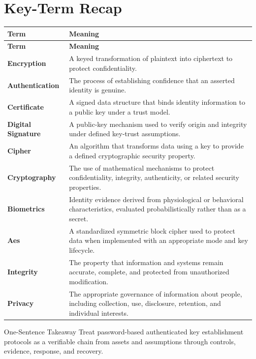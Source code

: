 \documentclass[11pt,letterpaper]{article}
\begin{document}
\section*{Key-Term Recap}
\begin{longtable}{>{\raggedright\arraybackslash}p{}>{\raggedright\arraybackslash}p{}}
\toprule\rowcolor{Navy}\color{white}\textbf{Term} & \color{white}\textbf{Meaning}\\\midrule
\endfirsthead
\toprule\rowcolor{Navy}\color{white}\textbf{Term} & \color{white}\textbf{Meaning}\\\midrule
\endhead
\textbf{Encryption} & A keyed transformation of plaintext into ciphertext to protect confidentiality. \\\midrule
\textbf{Authentication} & The process of establishing confidence that an asserted identity is genuine. \\\midrule
\textbf{Certificate} & A signed data structure that binds identity information to a public key under a trust model. \\\midrule
\textbf{Digital Signature} & A public-key mechanism used to verify origin and integrity under defined key-trust assumptions. \\\midrule
\textbf{Cipher} & An algorithm that transforms data using a key to provide a defined cryptographic security property. \\\midrule
\textbf{Cryptography} & The use of mathematical mechanisms to protect confidentiality, integrity, authenticity, or related security properties. \\\midrule
\textbf{Biometrics} & Identity evidence derived from physiological or behavioral characteristics, evaluated probabilistically rather than as a secret. \\\midrule
\textbf{Aes} & A standardized symmetric block cipher used to protect data when implemented with an appropriate mode and key lifecycle. \\\midrule
\textbf{Integrity} & The property that information and systems remain accurate, complete, and protected from unauthorized modification. \\\midrule
\textbf{Privacy} & The appropriate governance of information about people, including collection, use, disclosure, retention, and individual interests. \\\midrule
\bottomrule
\end{longtable}
\begin{CornellExamBox}{One-Sentence Takeaway}
Treat password-based authenticated key establishment protocols as a verifiable chain from assets and assumptions through controls, evidence, response, and recovery.
\end{CornellExamBox}
\end{document}

